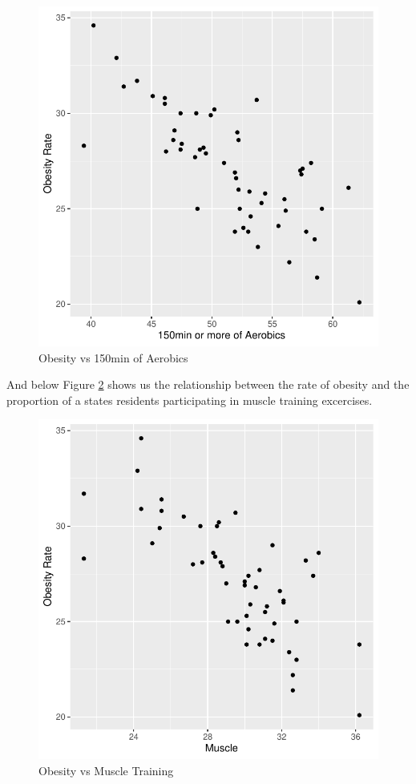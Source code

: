 \documentclass[
]{article}
\begin{document}
\begin{figure}
\centering
\includegraphics{paper_files/figure-latex/fig5-1.pdf}
\caption{\label{fig:fig5}Obesity vs 150min of Aerobics}
\end{figure}

And below Figure \ref{fig:fig6} shows us the relationship between the rate of obesity and the proportion of a states residents participating in muscle training excercises.

\begin{figure}
\centering
\includegraphics{paper_files/figure-latex/fig6-1.pdf}
\caption{\label{fig:fig6}Obesity vs Muscle Training}
\end{figure}
\end{document}
